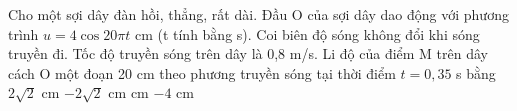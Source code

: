 \begin{vidu}%
Cho một sợi dây đàn hồi, thẳng, rất dài. Đầu O của sợi dây dao động với phương trình $u = 4\cos20\pi t$ cm (t tính bằng s). Coi biên độ sóng không đổi khi sóng truyền đi. Tốc độ truyền sóng trên dây là 0,8 m/s. Li độ của điểm M trên dây cách O một đoạn 20 cm theo phương truyền sóng tại thời điểm $t = 0,35$ s bằng
\choice
{$2\sqrt{2}$ cm}
{$-2\sqrt{2}$ cm}
{ cm}
{$-4$ cm}
\end{vidu} %


